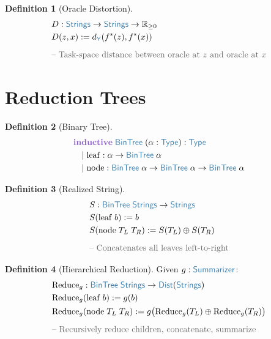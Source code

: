 \documentclass[11pt]{article}
\theoremstyle{definition}
\newtheorem{defnenv}{Definition}
\theoremstyle{plain}
\newcommand{\kw}[1]{\textcolor{keyword}{\textbf{#1}}}
\newcommand{\ty}[1]{\textcolor{type}{\mathsf{#1}}}
\newcommand{\fn}[1]{\mathrm{#1}}
\newcommand{\cmt}[1]{\textcolor{comment}{\text{-- #1}}}
\newcommand{\arr}{\to}
\newcommand{\defeq}{:=}
\newcommand{\Strings}{\ty{Strings}}
\newcommand{\Y}{\ty{Y}}
\newcommand{\Rnn}{\mathbb{R}_{\geq 0}}
\newcommand{\Type}{\ty{Type}}
\newcommand{\Dist}[1]{\ty{Dist}(#1)}
\newcommand{\fstar}{f^*}
\newcommand{\dY}{d_{\Y}}
\newcommand{\concat}{\oplus}
\newcommand{\reduce}{\fn{Reduce}_g}
\begin{document}
\begin{defnenv}[Oracle Distortion]
\label{def:distortion}
\begin{align*}
&D : \Strings \arr \Strings \arr \Rnn \\
&D(z, x) \defeq \dY(\fstar(z), \fstar(x)) \\[6pt]
&\cmt{Task-space distance between oracle at $z$ and oracle at $x$}
\end{align*}
\end{defnenv}

\section{Reduction Trees}
\label{sec:trees}

\begin{defnenv}[Binary Tree]
\label{def:bintree}
\begin{align*}
&\kw{inductive}\; \ty{BinTree}\; (\alpha : \Type) : \Type \\
&\quad | \; \fn{leaf} : \alpha \arr \ty{BinTree}\;\alpha \\
&\quad | \; \fn{node} : \ty{BinTree}\;\alpha \arr \ty{BinTree}\;\alpha \arr \ty{BinTree}\;\alpha
\end{align*}
\end{defnenv}

\begin{defnenv}[Realized String]
\label{def:realized}
\begin{align*}
&S : \ty{BinTree}\;\Strings \arr \Strings \\
&S(\fn{leaf}\; b) \defeq b \\
&S(\fn{node}\; T_L\; T_R) \defeq S(T_L) \concat S(T_R) \\[6pt]
&\cmt{Concatenates all leaves left-to-right}
\end{align*}
\end{defnenv}

\begin{defnenv}[Hierarchical Reduction]
\label{def:reduce}
Given $g : \ty{Summarizer}$:
\begin{align*}
&\reduce : \ty{BinTree}\;\Strings \arr \Dist{\Strings} \\
&\reduce(\fn{leaf}\; b) \defeq g(b) \\
&\reduce(\fn{node}\; T_L\; T_R) \defeq g\big(\reduce(T_L) \concat \reduce(T_R)\big) \\[6pt]
&\cmt{Recursively reduce children, concatenate, summarize}
\end{align*}
\end{defnenv}
\end{document}
